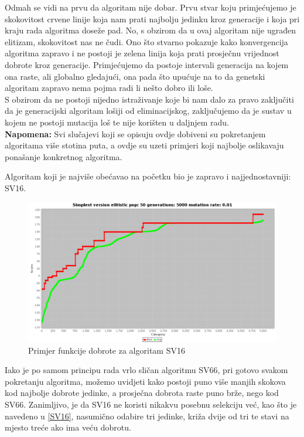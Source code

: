 \documentclass[times, utf8, zavrsni]{fer}
\begin{document}
	
	Odmah se vidi na prvu da algoritam nije dobar. Prvu stvar koju primjećujemo je skokovitost crvene linije koja nam prati najbolju jedinku kroz generacije i koja pri kraju rada algoritma doseže pad. No, s obzirom da u ovaj algoritam nije ugrađen elitizam, skokovitost nas ne čudi. Ono što stvarno pokazuje kako konvergencija algoritma zapravo i ne postoji je zelena linija koja prati prosječnu vrijednost dobrote kroz generacije. Primjećujemo da postoje intervali generacija na kojem ona raste, ali globalno gledajući, ona pada što upućuje na to da genetski algoritam zapravo nema pojma radi li nešto dobro ili loše.\\
	S obzirom da ne postoji nijedno istraživanje koje bi nam dalo za pravo zaključiti da je generacijski algoritam lošiji od eliminacijskog, zaključujemo da je sustav u kojem ne postoji mutacija loš te nije korišten u daljnjem radu. \\
	\textbf{Napomena: } Svi slučajevi koji se opisuju ovdje dobiveni su pokretanjem algoritama više stotina puta, a ovdje su uzeti primjeri koji najbolje oslikavaju ponašanje konkretnog algoritma.  
	
	Algoritam koji je najviše obećavao na početku bio je zapravo i najjednostavniji: SV16. 
	
	\begin{figure}[!htb]
		\centering
		\includegraphics[width=18cm]{slike/SV16Hibrid.png}
		\caption{Primjer funkcije dobrote za algoritam SV16}
		\label{fig:sv16-alg-hibrid}
	\end{figure} 
	
	Iako je po samom principu rada vrlo sličan algoritmu SV66, pri gotovo svakom pokretanju algoritma, možemo uvidjeti kako postoji puno više manjih skokova kod najbolje dobrote jedinke, a prosječna dobrota raste puno brže, nego kod SV66. Zanimljivo, je da SV16 ne koristi nikakvu posebnu selekciju već, kao što je navedeno u \ref{SV16}, nasumično odabire tri jedinke, križa dvije od tri te stavi na mjesto treće ako ima veću dobrotu. 
	
\end{document}

